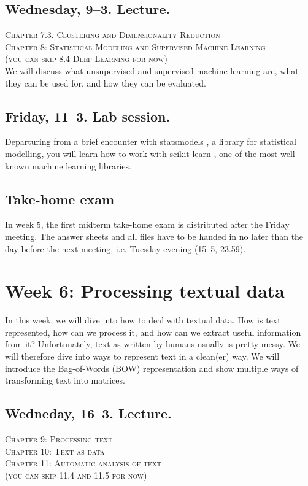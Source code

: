\subsection*{Wednesday, 9--3. Lecture.}

\textsc{ Chapter 7.3. Clustering and Dimensionality Reduction}\\
\textsc{ Chapter 8: Statistical Modeling and Supervised Machine Learning}\\
\textsc{ (you can skip 8.4 Deep Learning for now)}\\

We will discuss what unsupervised and supervised machine learning are, what they can be used for, and how they can be evaluated.

\subsection*{Friday, 11--3. Lab session.}
Departuring from a brief encounter with statsmodels \citep{statsmodels}, a library for statistical modelling, you will learn how to work with scikit-learn \citep{scikit-learn}, one of the most well-known machine learning libraries.

\subsection*{Take-home exam}
In week 5, the first midterm take-home exam is distributed after the Friday meeting. The answer sheets and all files have to be handed in no later than the day before the next meeting, i.e. Tuesday evening (15--5, 23.59).





\section*{Week 6: Processing textual data}
In this week, we will dive into how to deal with textual data. How is text represented, how can we process it, and how can we extract useful information from it?
Unfortunately, text as written by humans usually is pretty messy.  We will therefore dive  into ways to represent text in a clean(er) way. We will introduce the Bag-of-Words (BOW) representation and show multiple ways of transforming text into matrices.


\subsection*{Wedneday, 16--3. Lecture.}
\textsc{ Chapter 9: Processing text}\\
\textsc{ Chapter 10: Text as data}\\
\textsc{ Chapter 11: Automatic analysis of text}\\
\textsc{ (you can skip 11.4 and 11.5 for now)}\\
  
